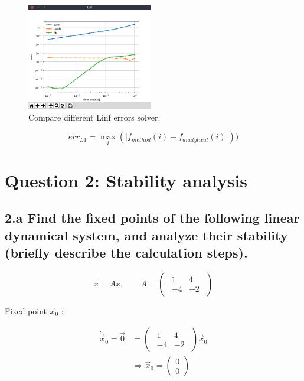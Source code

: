 \documentclass{cmc}
\begin{document}
\begin{figure}[H]
  \centering
  \includegraphics[width=0.49\textwidth,trim={0 1.25cm 0 0},clip]{figures/ex1_Linf_errors.png}
  \caption{Compare different Linf errors solver.}
  \label{fig:ex1_Linf_errors}
\end{figure}

$$err_{L1} = \max_i \left(\lvert f_{method}(i) - f_{analytical}(i) \rvert\right))$$

\section*{Question 2: Stability analysis}

\subsection*{2.a Find the fixed points of the following linear dynamical system,
  and analyze their stability (briefly describe the calculation steps).}

\begin{equation}
  \label{eq:system}
  \dot{x} = A x,
  \qquad
  A =
  \begin{pmatrix}
    \begin{array}{rr}
      1 & 4 \\
      -4 & -2
    \end{array}
  \end{pmatrix}
\end{equation}

Fixed point $\vec{x}_0$ :

\begin{align*}
	\dot{\vec{x}}_0 = \vec{0} &= 
	\begin{pmatrix}
		\begin{array}{rr}
			1 & 4 \\ -4 & -2
		\end{array}
	\end{pmatrix} \vec{x}_0 \\
	&\Rightarrow \vec{x}_0 = 
	\begin{pmatrix}
		0 \\ 0
	\end{pmatrix}
\end{align*}
\end{document}
